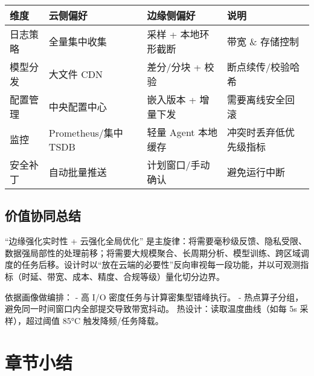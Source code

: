 \begin{longtable}[]{@{}
  >{\raggedright\arraybackslash}p{}
  >{\raggedright\arraybackslash}p{}
  >{\raggedright\arraybackslash}p{}
  >{\raggedright\arraybackslash}p{}@{}}
\toprule\noalign{}
\begin{minipage}[b]{\linewidth}\raggedright
维度
\end{minipage} & \begin{minipage}[b]{\linewidth}\raggedright
云侧偏好
\end{minipage} & \begin{minipage}[b]{\linewidth}\raggedright
边缘侧偏好
\end{minipage} & \begin{minipage}[b]{\linewidth}\raggedright
说明
\end{minipage} \\
\midrule\noalign{}
\endhead
\bottomrule\noalign{}
\endlastfoot
日志策略 & 全量集中收集 & 采样 + 本地环形截断 & 带宽 \& 存储控制 \\
模型分发 & 大文件 CDN & 差分/分块 + 校验 & 断点续传/校验哈希 \\
配置管理 & 中央配置中心 & 嵌入版本 + 增量下发 & 需要离线安全回滚 \\
监控 & Prometheus/集中 TSDB & 轻量 Agent 本地缓存 &
冲突时丢弃低优先级指标 \\
安全补丁 & 自动批量推送 & 计划窗口/手动确认 & 避免运行中断 \\
\end{longtable}

\subsection{价值协同总结}\label{ux4ef7ux503cux534fux540cux603bux7ed3}

``边缘强化实时性 + 云强化全局优化''
是主旋律：将需要毫秒级反馈、隐私受限、数据强局部性的处理前移；将需要大规模聚合、长周期分析、模型训练、跨区域调度的任务后移。设计时以``放在云端的必要性''反向审视每一段功能，并以可观测指标（时延、带宽、成本、精度、合规等级）量化切分边界。

依据画像做编排： - 高 I/O 密度任务与计算密集型错峰执行。 -
热点算子分组，避免同一时间窗口内全部提交导致带宽抖动。
热设计：读取温度曲线（如每 5s 采样），超过阈值 85°C 触发降频/任务降载。

\section{章节小结}\label{ux7ae0ux8282ux5c0fux7ed3}


